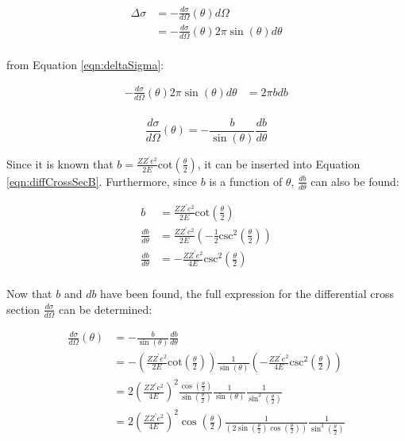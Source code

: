 \documentclass[a4paper]{article}
\begin{document}
\begin{align*}
  \Delta \sigma &=- \frac{d\sigma}{d\Omega} (\theta) d\Omega \\ 
                &= - \frac{d\sigma}{d\Omega} (\theta) 2 \pi 
                  \sin{(\theta)} d\theta \\
\end{align*} 

from Equation \ref{eqn:deltaSigma}:

\begin{align*}
  - \frac{d\sigma}{d\Omega} (\theta) 2 \pi \sin{(\theta)} d\theta &= 2 \pi b db
  \\
\end{align*}

\begin{equation}
  \frac{d\sigma}{d\Omega} (\theta) = 
  - \frac{b}{\sin{(\theta)}} \frac{db}{d\theta} 
\end{equation}
\label{eqn:diffCrossSecB}

Since it is known that \( b = \frac{Z Z^{\prime} e^2}{2 E}
\text{cot} \left( \frac{\theta}{2} \right) \), it can be inserted into Equation
\ref{eqn:diffCrossSecB}. Furthermore, since \( b \) is a function of \( \theta
\), \( \frac{db}{d\theta} \) can also be found:

\begin{align*}
  b &= \frac{Z Z^{\prime} e^2}{2 E} \text{cot} \left( \frac{\theta}{2} \right)
  \\
  \frac{db}{d\theta} &= \frac{Z Z^{\prime} e^2}{2 E}
                       \left( - \frac{1}{2} \text{csc}^2 \left( \frac{\theta}{2}
                       \right) \right) \\
  \frac{db}{d\theta} &= - \frac{Z Z^{\prime} e^2}{4 E} \text{csc}^2 \left(
                       \frac{\theta}{2} \right) \\
\end{align*} 

\qq Now that \( b \) and \( db \) have been found, the full expression for the
differential cross section \( \frac{d\sigma}{d\Omega} \) can be determined:

\begin{align*}
  \frac{d\sigma}{d\Omega} (\theta) 
  &= - \frac{b}{\sin{(\theta)}} \frac{db}{d\theta} \\
  &= - \left( \frac{Z Z^{\prime} e^2}{2 E} \text{cot} \left( \frac{\theta}{2}
    \right) \right)
    \frac{1}{\sin{(\theta)}} 
    \left( - \frac{Z Z^{\prime} e^2}{4 E} \text{csc}^2 \left( \frac{\theta}{2}
    \right) \right) \\
  &= 2 \left( \frac{Z Z^{\prime} e^2}{4 E} \right)^2
    \frac{\cos{\left( \frac{\theta}{2} \right)}}{\sin{\left(
    \frac{\theta}{2} \right)}}
    \frac{1}{\sin{(\theta)}}
    \frac{1}{\sin^2 \left( \frac{\theta}{2} \right)} \\
  &= 2 \left( \frac{Z Z^{\prime} e^2}{4 E} \right)^2
    \cos{\left( \frac{\theta}{2} \right)}
    \frac{1}{\left( 2 \sin{\left( \frac{\theta}{2} \right)} \cos{\left(
    \frac{\theta}{2} \right)} \right)} 
    \frac{1}{\sin^3 \left( \frac{\theta}{2} \right)} \\
\end{align*}
\end{document}
